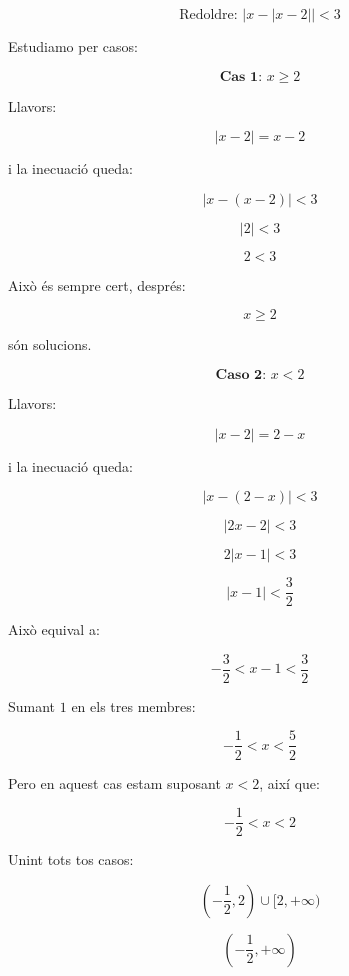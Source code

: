 \[
\text{Redoldre: } \left|x-\left|x-2\right|\right|<3
\]

Estudiamo per casos:

\[
\textbf{Cas 1: } x\geq 2
\]

Llavors:

\[
|x-2|=x-2
\]

i la inecuació queda:

\[
|x-(x-2)|<3
\]

\[
|2|<3
\]

\[
2<3
\]

Això és sempre cert, després:

\[
x\geq 2
\]

són solucions.

\vspace{0.5cm}

\[
\textbf{Caso 2: } x<2
\]

Llavors:

\[
|x-2|=2-x
\]

i la inecuació queda:

\[
|x-(2-x)|<3
\]

\[
|2x-2|<3
\]

\[
2|x-1|<3
\]

\[
|x-1|<\frac{3}{2}
\]

Això equival a:

\[
-\frac{3}{2}<x-1<\frac{3}{2}
\]

Sumant \(1\) en els tres membres:

\[
-\frac{1}{2}<x<\frac{5}{2}
\]

Pero en aquest cas estam suposant \(x<2\), així que:

\[
-\frac{1}{2}<x<2
\]

\vspace{0.5cm}

Unint tots tos casos:

\[
\left(-\frac{1}{2},2\right)\cup [2,+\infty)
\]

\[
\boxed{\left(-\frac{1}{2},+\infty\right)}
\]
